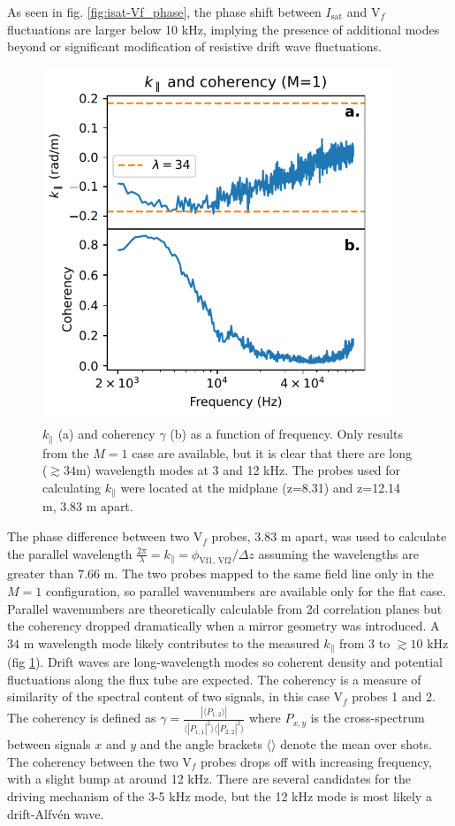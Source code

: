 As seen in fig. \ref{fig:isat-Vf_phase}, the phase shift between $I_\text{sat}$ and V$_f$ fluctuations are larger below 10 kHz, implying the presence of additional modes beyond or significant modification of resistive drift wave fluctuations.
\begin{figure}
    \centering
    \includegraphics[width=300pt]{figures/fig11.pdf}
    \caption[$k_\parallel$ and coherency $\gamma$]{$k_\parallel$ (a) and coherency $\gamma$ (b) as a function of frequency. Only results from the $M=1$ case are available, but it is clear that there are long ($\gtrsim 34$m) wavelength modes at 3 and 12 kHz. The probes used for calculating $k_\parallel$ were located at the midplane (z=8.31) and z=12.14 m, 3.83 m apart.}
    \label{fig:kparallel-coherency}
\end{figure}
The phase difference between two V$_f$ probes, $3.83$ m apart, was used to calculate the parallel wavelength $\frac{2 \pi}{\lambda} = k_\parallel = \phi_{\text{Vf1, Vf2}} / \Delta z$ assuming the wavelengths are greater than $7.66$ m. The two probes mapped to the same field line only in the $M=1$ configuration, so parallel wavenumbers are available only for the flat case. Parallel wavenumbers are theoretically calculable from 2d correlation planes but the coherency dropped dramatically when a mirror geometry was introduced.
A $34$ m wavelength mode likely contributes to the measured $k_\parallel$ from $3$ to  $\gtrsim 10$ kHz (fig \ref{fig:kparallel-coherency}). Drift waves are long-wavelength modes so coherent density and potential fluctuations along the flux tube are expected. The coherency is a measure of similarity of the spectral content of two signals, in this case V$_f$ probes 1 and 2. The coherency is defined as $\gamma = \frac{|\langle P_{1,2} \rangle|}{\langle |P_{1,1}|^2 \rangle \langle |P_{2,2}|^2 \rangle}$ where $P_{x,y}$ is the cross-spectrum between signals $x$ and $y$ and the angle brackets $\langle \rangle$ denote the mean over shots. The coherency between the two V$_f$ probes drops off with increasing frequency, with a slight bump at around 12 kHz. There are several candidates for the driving mechanism of the 3-5 kHz mode, but the 12 kHz mode is most likely a drift-Alfvén wave.

